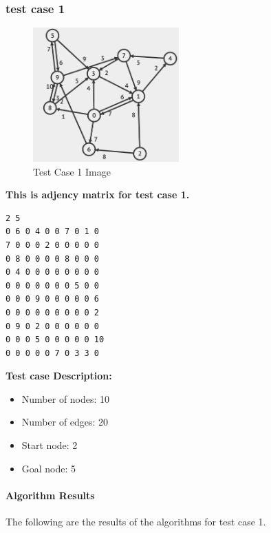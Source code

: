\subsubsection{test case 1}
\begin{figure}[h!]
    \centering
    \includegraphics[width=0.5\textwidth]{testcase/1.PNG}
    \caption{Test Case 1 Image}
\end{figure}
\textbf{This is adjency matrix for test case 1.} 
\begin{verbatim}
2 5
0 6 0 4 0 0 7 0 1 0
7 0 0 0 2 0 0 0 0 0
0 8 0 0 0 0 8 0 0 0
0 4 0 0 0 0 0 0 0 0
0 0 0 0 0 0 0 5 0 0
0 0 0 9 0 0 0 0 0 6
0 0 0 0 0 0 0 0 0 2
0 9 0 2 0 0 0 0 0 0
0 0 0 5 0 0 0 0 0 10
0 0 0 0 0 7 0 3 3 0    
\end{verbatim}
\textbf{Test case Description:} 
\begin{itemize}
    \item Number of nodes: 10
    \item Number of edges: 20
    \item Start node: 2
    \item Goal node: 5
\end{itemize}

\paragraph*{Algorithm Results}
\quad The following are the results of the algorithms for test case 1.

